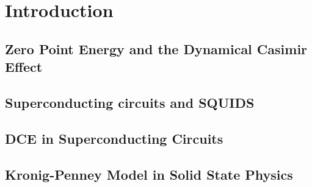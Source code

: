 \chapter{Introduction} %

\section{Zero Point Energy and the Dynamical Casimir Effect}
\section{Superconducting circuits and SQUIDS}
\section{DCE in Superconducting Circuits}
\section{Kronig-Penney Model in Solid State Physics}

